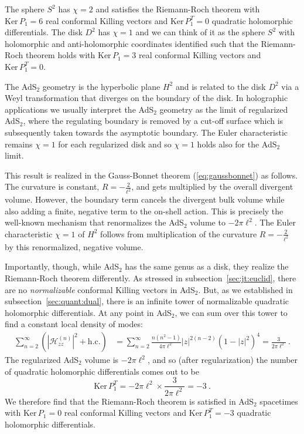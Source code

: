 \documentclass[12pt]{article}
\begin{document}
The sphere $S^2$ has $\chi = 2$ and satisfies the Riemann-Roch theorem with $\text{Ker}\,P_1 = 6$ real conformal Killing vectors and $\text{Ker}\,P_1^T = 0$ quadratic holomorphic differentials.  The disk $D^2$ has $\chi = 1$ and we can think of it as the sphere $S^2$ with holomorphic and anti-holomorphic coordinates identified such that the Riemann-Roch theorem holds with $\text{Ker}\,P_1 = 3$ real conformal Killing vectors and $\text{Ker}\,P_1^T = 0$.

The AdS$_2$ geometry is the hyperbolic plane $H^2$ and is related to the disk $D^2$ via a Weyl transformation that diverges on the boundary of the disk.  In holographic applications we usually interpret the AdS$_2$ geometry as the limit of regularized AdS$_2$, where the regulating boundary is removed by a cut-off surface which is subsequently taken towards the asymptotic boundary.  The Euler characteristic remains $\chi = 1$ for each regularized disk and so $\chi = 1$ holds also for the AdS$_2$ limit.

This result is realized in the Gauss-Bonnet theorem (\ref{eq:gaussbonnet}) as follows.  The curvature is constant, $R = -\frac{2}{\ell^2}$, and gets multiplied by the overall divergent volume.  However, the boundary term cancels the divergent bulk volume while also adding a finite, negative term to the on-shell action.  This is precisely the well-known mechanism that renormalizes the AdS$_2$ volume to $-2\pi \ell^2$. The Euler characteristic  $\chi = 1$ of $H^2$ follows from multiplication of the curvature $R = -\frac{2}{\ell^2}$ by this renormalized, negative volume.

Importantly, though, while AdS$_2$ has the same genus as a disk, they realize the Riemann-Roch theorem differently. As stressed in subsection~\ref{sec:jt:euclid}, there are no \emph{normalizable} conformal Killing vectors in AdS$_2$.  But, as we established in subsection~\ref{sec:quant:dual}, there is an infinite tower of normalizable quadratic holomorphic differentials.  At any point in AdS$_2$, we can sum over this tower to find a constant local density of modes:  
\begin{equation}\begin{aligned}
	\sum_{n=2}^\infty \left( |\mathcal{H}_{zz}^{(n)}|^2 + \text{h.c.} \right) &= \sum_{n=2}^\infty \frac{n(n^2-1)}{4\pi \ell^2} |z|^{2(n-2)} \left(1- |z|^2\right)^4 = \frac{3}{2\pi \ell^2}~.
\end{aligned}\end{equation}
The regularized AdS$_2$ volume is $-2\pi \ell^2$, and so (after regularization) the number of quadratic holomorphic differentials comes out to be
\begin{equation}
	\text{Ker}\,P_1^T = -2\pi\ell^2 \times \frac{3}{2\pi \ell^2} = -3~.
\end{equation}
We therefore find that the Riemann-Roch theorem is satisfied in AdS$_2$ spacetimes with $\text{Ker}\,P_1 = 0$ real conformal Killing vectors and $\text{Ker}\,P_1^T = -3$ quadratic holomorphic differentials.
\end{document}
